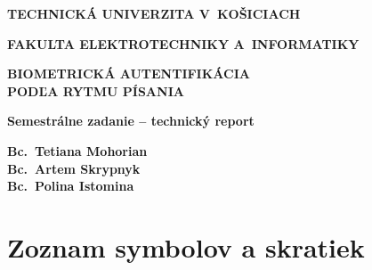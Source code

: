 \documentclass[11pt,a4paper]{article}
\newcommand{\sectionbreak}{\clearpage} %
\newcommand{\tukeheader}{%
  {\bfseries\LARGE TECHNICKÁ UNIVERZITA V~KOŠICIACH\par}
  \vspace{0.8em}
  {\bfseries\Large FAKULTA ELEKTROTECHNIKY A~INFORMATIKY\par}}
\newcommand{\worktitle}{%
  {\bfseries\LARGE BIOMETRICKÁ AUTENTIFIKÁCIA\\PODĽA RYTMU PÍSANIA\par}
  \vspace{0.8em}
  {\bfseries\large Semestrálne zadanie -- technický report\par}}
\newcommand{\authorlines}{Bc.\ Tetiana Mohorian\\ Bc.\ Artem Skrypnyk\\ Bc.\ Polina Istomina}
\newcommand{\titlefooter}[1]{%
  \noindent\begin{minipage}[b]{0.4\textwidth}\raggedright\bfseries\large #1\end{minipage}%
  \hfill
  \begin{minipage}[b]{0.55\textwidth}\raggedleft\bfseries\large \authorlines\end{minipage}}
\begin{document}
\begin{titlepage}
  \centering
  \tukeheader
  \vspace*{\fill}               %
  \worktitle
  \vspace*{\fill}
  \titlefooter{\the\year}       %
\end{titlepage}

\begin{singlespace}
\setlength{\parskip}{0pt}                 %
\tableofcontents
\end{singlespace}

\clearpage
{}
\begin{singlespace}
\setlength{\parskip}{0pt}
\listoffigures
\end{singlespace}

\clearpage
{}
\begin{singlespace}
\setlength{\parskip}{0pt}
\listoftables
\end{singlespace}

\clearpage
\section*{Zoznam symbolov a skratiek}
\end{document}
